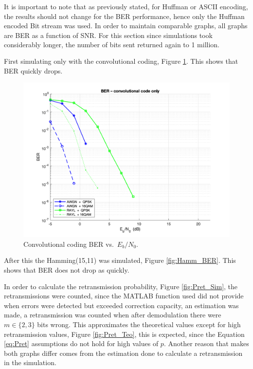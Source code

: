 It is important to note that as previously stated, for Huffman or ASCII encoding, the results should not change for the BER performance, hence only the Huffman encoded Bit stream was used. In order to maintain comparable graphs, all graphs are BER as a function of SNR. For this section since simulations took considerably longer, the number of bits sent returned again to 1 million.

First simulating only with the convolutional coding, Figure \ref{fig:Conv_BER}. This shows that BER quickly drops.

\begin{figure}[H]
  \centering
  \includegraphics[width=0.7\linewidth]{Images/ConvCodeBER.png}
  \caption{Convolutional  coding BER vs.\ $E_b/N_0$.}
  \label{fig:Conv_BER}
\end{figure}

After this the Hamming(15,11) was simulated, Figure \ref{fig:Hamm_BER}. This shows that BER does not drop as quickly. 

In order to calculate the retransmission probability, Figure \ref{fig:Pret_Sim}, the retransmissions were counted, since the MATLAB function used did not provide when errors were detected but exceeded correction capacity, an estimation was made, a retransmission was counted when after demodulation there were $m \in \{2,3\}$ bits wrong. This approximates the theoretical values except for high retransmission values, Figure \ref{fig:Pret_Teo}, this is expected, since the Equation \ref{eq:Pret} assumptions do not hold for high values of $p$. Another reason that makes both graphs differ comes from the estimation done to calculate a retransmission in the simulation.

